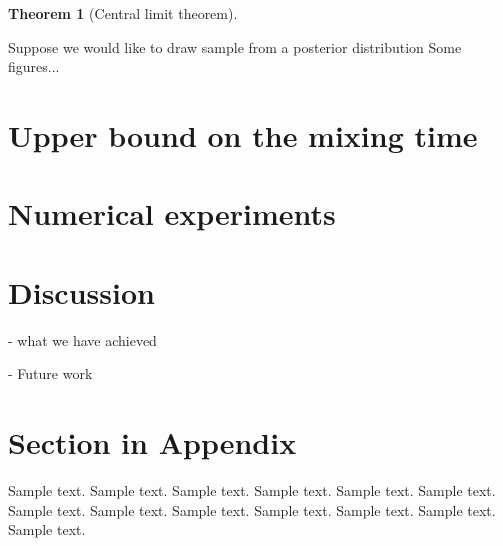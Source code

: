 \documentclass[preprint,12pt,3p]{elsarticle}
\newtheorem{theorem}{Theorem}
\begin{document}
\begin{theorem}[Central limit theorem]

\end{theorem}

Suppose we would like to draw sample from a posterior distribution
Some figures...
\section{Upper bound on the mixing time} %
\label{sec:upper_bound_on_the_mixing_time}

\section{Numerical experiments} %
\label{sec:numerical_experiments}




\section{Discussion} %
\label{sec:discussion}

- what we have achieved

- Future work

\newpage
\appendix

\section{Section in Appendix}
\label{appendix-sec1}

Sample text. Sample text. Sample text. Sample text. Sample text. Sample text.
Sample text. Sample text. Sample text. Sample text. Sample text. Sample text.
Sample text.




% 
% 
% 
% 
% 
% 
% 
% 
% 
% 
% 
% 


\end{document}
